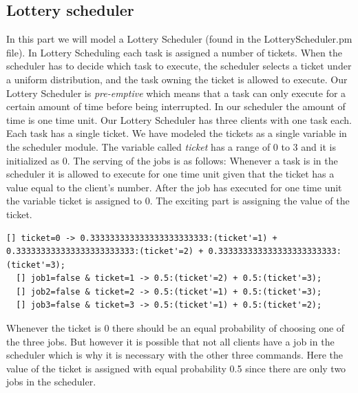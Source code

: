 \documentclass[12pt]{report}
\begin{document}
\subsection*{Lottery scheduler}
In this part we will model a Lottery Scheduler (found in the LotteryScheduler.pm file). In Lottery Scheduling each task is assigned a number of tickets. When the scheduler has to decide which task to execute, the scheduler selects a ticket under a uniform distribution, and the task owning the ticket is allowed to execute. Our Lottery Scheduler is \emph{pre-emptive} which means that a task can only execute for a certain amount of time before being interrupted. In our scheduler the amount of time is one time unit.  Our Lottery Scheduler has three clients with one task each. Each task has a single ticket. We have modeled the tickets as a single variable in the scheduler module. The variable called \emph{ticket} has a range of 0 to 3 and it is initialized as 0. The serving of the jobs is as follows: Whenever a task is in the scheduler it is allowed to execute for one time unit given that the ticket has a value equal to the client's number. After the job has executed for one time unit the variable ticket is assigned to 0. The exciting part is assigning the value of the ticket.

\begin{lstlisting}[style=prismmodel]
  [] ticket=0 -> 0.333333333333333333333333:(ticket'=1) + 0.333333333333333333333333:(ticket'=2) + 0.333333333333333333333333:(ticket'=3);
  [] job1=false & ticket=1 -> 0.5:(ticket'=2) + 0.5:(ticket'=3);
  [] job2=false & ticket=2 -> 0.5:(ticket'=1) + 0.5:(ticket'=3);
  [] job3=false & ticket=3 -> 0.5:(ticket'=1) + 0.5:(ticket'=2);
\end{lstlisting}
Whenever the ticket is 0 there should be an equal probability of choosing one of the three jobs. But however it is possible that not all clients have a job in the scheduler which is why it is necessary with the other three commands. Here the value of the ticket is assigned with equal probability 0.5 since there are only two jobs in the scheduler.
\end{document}
